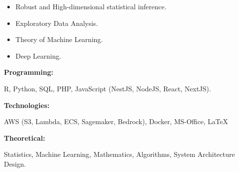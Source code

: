 \documentclass[9pt]{developercv} %
\begin{document}
\begin{minipage}[t]{0.46\textwidth}
    \vspace{-6pt}

    \begin{itemize}[noitemsep]
        \item Robust and High-dimensional statistical inference.
        \item Exploratory Data Analysis.
        \item Theory of Machine Learning.
        \item Deep Learning.
    \end{itemize}

\end{minipage}
\hfill %
\begin{minipage}[t]{0.46\textwidth}
    \vspace{-6pt}

    \begin{minipage}[t]{0.25\textwidth}
        \textbf{Programming:}
    \end{minipage}
    \hfill
    \begin{minipage}[t]{0.7\textwidth}
        R, Python, SQL, PHP, JavaScript (NestJS, NodeJS, React, NextJS).
    \end{minipage}
    \vspace{4mm}

    \begin{minipage}[t]{0.25\textwidth}
        \textbf{Technologies: }
    \end{minipage}
    \hfill
    \begin{minipage}[t]{0.7\textwidth}
        AWS (S3, Lambda, ECS, Sagemaker, Bedrock), Docker, MS-Office, \LaTeX
    \end{minipage}
    \vspace{4mm}

    \begin{minipage}[t]{0.2\textwidth}
        \textbf{Theoretical:}
    \end{minipage}
    \hfill
    \begin{minipage}[t]{0.75\textwidth}
        Statistics, Machine Learning, Mathematics, Algorithms, System Architecture Design.
    \end{minipage}

\end{minipage}
\end{document}
